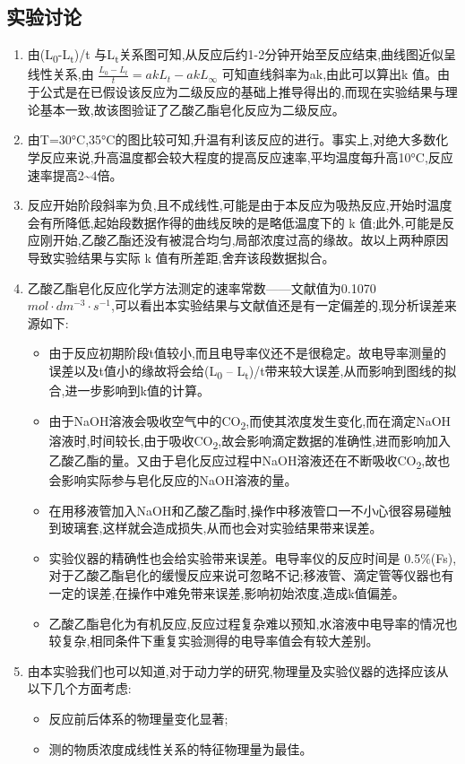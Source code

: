 \documentclass[11pt]{article}
\begin{document}
\subsection{实验讨论}
\label{sec:orgca39921}
\begin{enumerate}
\item 由(L\textsubscript{0}-L\textsubscript{t})/t 与L\textsubscript{t}关系图可知,从反应后约1-2分钟开始至反应结束,曲线图近似呈线性关系,由 \(\frac{L_{0}-L_{t}}{t}=akL_{t}-akL_{\infty}\) 可知直线斜率为ak,由此可以算出k 值。由于公式是在已假设该反应为二级反应的基础上推导得出的,而现在实验结果与理论基本一致,故该图验证了乙酸乙酯皂化反应为二级反应。
\item 由T=30°C,35°C的图比较可知,升温有利该反应的进行。事实上,对绝大多数化学反应来说,升高温度都会较大程度的提高反应速率,平均温度每升高10°C,反应速率提高2\textasciitilde{}4倍。
\item 反应开始阶段斜率为负,且不成线性,可能是由于本反应为吸热反应,开始时温度会有所降低,起始段数据作得的曲线反映的是略低温度下的 k 值;此外,可能是反应刚开始,乙酸乙酯还没有被混合均匀,局部浓度过高的缘故。故以上两种原因导致实验结果与实际 k 值有所差距,舍弃该段数据拟合。
\item 乙酸乙酯皂化反应化学方法测定的速率常数——文献值为0.1070\(mol\cdot dm^{-3}\cdot s^{-1}\),可以看出本实验结果与文献值还是有一定偏差的,现分析误差来源如下:
\begin{itemize}
\item 由于反应初期阶段t值较小,而且电导率仪还不是很稳定。故电导率测量的误差以及t值小的缘故将会给(L\textsubscript{0} – L\textsubscript{t})/t带来较大误差,从而影响到图线的拟合,进一步影响到k值的计算。
\item 由于NaOH溶液会吸收空气中的CO\textsubscript{2},而使其浓度发生变化,而在滴定NaOH溶液时,时间较长,由于吸收CO\textsubscript{2},故会影响滴定数据的准确性,进而影响加入乙酸乙酯的量。又由于皂化反应过程中NaOH溶液还在不断吸收CO\textsubscript{2},故也会影响实际参与皂化反应的NaOH溶液的量。
\item 在用移液管加入NaOH和乙酸乙酯时,操作中移液管口一不小心很容易碰触到玻璃套,这样就会造成损失,从而也会对实验结果带来误差。
\item 实验仪器的精确性也会给实验带来误差。电导率仪的反应时间是\textpm{} 0.5\%(Fs),对于乙酸乙酯皂化的缓慢反应来说可忽略不记;移液管、滴定管等仪器也有一定的误差,在操作中难免带来误差,影响初始浓度,造成k值偏差。
\item 乙酸乙酯皂化为有机反应,反应过程复杂难以预知,水溶液中电导率的情况也较复杂,相同条件下重复实验测得的电导率值会有较大差别。
\end{itemize}
\item 由本实验我们也可以知道,对于动力学的研究,物理量及实验仪器的选择应该从以下几个方面考虑:
\begin{itemize}
\item 反应前后体系的物理量变化显著;
\item 测的物质浓度成线性关系的特征物理量为最佳。
\end{itemize}
\end{enumerate}
\end{document}
